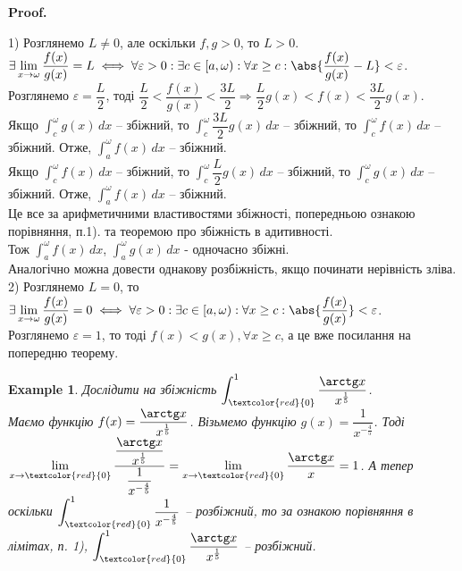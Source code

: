 \documentclass[a4paper, 10pt]{article}
\makeatletter
\def\huge{\displaystyle}
\def\qed{$\blacksquare$}
\theoremstyle{theoremdd}
\theoremstyle{theoremdd}
\theoremstyle{theoremdd}
\theoremstyle{theoremdd}
\theoremstyle{theoremdd}
\newtheorem{example}[theorem]{Example}
\theoremstyle{theoremdd}
\theoremstyle{theoremdd}
\theoremstyle{theoremdd}
\theoremstyle{theoremdd}
\renewenvironment{proof}[1][Proof.\\]{\par
\pushQED{\hfill \qed}%
\normalfont \topsep6\p@\@plus6\p@\relax
\trivlist
\item\relax
{\bfseries
#1\@addpunct{.}}\hspace\labelsep\ignorespaces
}{%
\popQED\endtrivlist\@endpefalse
}
\makeatother
\begin{document}
\begin{proof}
1) Розглянемо $L \neq 0$, але оскільки $f,g > 0$, то $L>0$.\\
$\exists \huge \lim_{x \to \omega} \dfrac{f(x)}{g(x)} = L \iff \forall \varepsilon > 0: \exists c \in [a,\omega): \forall x \geq c: \abs{\dfrac{f(x)}{g(x)} - L} < \varepsilon$.\\
Розглянемо $\varepsilon = \dfrac{L}{2}$, тоді $\dfrac{L}{2} < \dfrac{f(x)}{g(x)} < \dfrac{3L}{2} \Rightarrow \dfrac{L}{2}g(x) < f(x) < \dfrac{3L}{2}g(x)$.\\
Якщо $\huge\int_c^\omega g(x)\,dx$ -- збіжний, то $\huge\int_c^\omega \dfrac{3L}{2} g(x)\,dx$ -- збіжний, то $\huge\int_c^\omega f(x)\,dx$ -- збіжний. Отже, $\huge\int_a^\omega f(x)\,dx$ -- збіжний.\\
Якщо $\huge\int_c^\omega f(x)\,dx$ -- збіжний, то $\huge\int_c^\omega \dfrac{L}{2} g(x)\,dx$ -- збіжний, то $\huge\int_c^\omega g(x)\,dx$ -- збіжний. Отже, $\huge\int_a^\omega f(x)\,dx$ -- збіжний.\\
Це все за арифметичними властивостями збіжності, попередньою ознакою порівняння, п.1). та теоремою про збіжність в адитивності.\\
Тож $\huge\int_a^\omega f(x)\,dx$, $\huge\int_a^\omega g(x)\,dx$ - одночасно збіжні.\\
Аналогічно можна довести однакову розбіжність, якщо починати нерівність зліва.
\bigskip \\
2) Розглянемо $L = 0$, то $\exists \huge \lim_{x \to \omega} \dfrac{f(x)}{g(x)} = 0 \iff \forall \varepsilon > 0: \exists c \in [a,\omega): \forall x \geq c: \abs{\dfrac{f(x)}{g(x)}} < \varepsilon$.\\
Розглянемо $\varepsilon = 1$, то тоді $f(x) < g(x), \forall x \geq c$, а це вже посилання на попередню теорему.
\end{proof}

\begin{example}
Дослідити на збіжність $\huge\int_{\textcolor{red}{0}}^{1} \dfrac{\arctg x}{x^{\frac{1}{5}}}$.\\
Маємо функцію $f(x) = \dfrac{\arctg x}{x^{\frac{1}{5}}}$. Візьмемо функцію $g(x) = \dfrac{1}{x^{-\frac{4}{5}}}$. Тоді $\huge \lim_{x \to \textcolor{red}{0}} \dfrac{\dfrac{\arctg x}{x^{\frac{1}{5}}}}{\dfrac{1}{x^{-\frac{4}{5}}}} = \lim_{x \to \textcolor{red}{0}} \dfrac{\arctg x}{x} = 1$. А тепер оскільки $\huge\int_{\textcolor{red}{0}}^{1} \dfrac{1}{x^{-\frac{4}{5}}}$ -- розбіжний, то за ознакою порівняння в лімітах, п. 1), $\huge\int_{\textcolor{red}{0}}^{1} \dfrac{\arctg x}{x^{\frac{1}{5}}}$ -- розбіжний.
\end{example}
\end{document}

